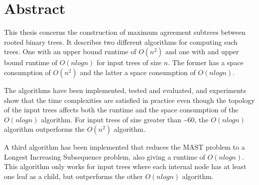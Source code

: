\chapter*{Abstract}
This thesis concerns the construction of maximum agreement subtrees between rooted binary trees. It describes two different algorithms for computing such trees. One with an upper bound runtime of $O(n^2)$ and one with and upper bound runtime of $O(nlogn)$ for input trees of size $n$. The former has a space consumption of $O(n^2)$ and the latter a space consumption of $O(nlogn)$.

The algorithms have been implemented, tested and evaluated, and experiments show that the time complexities are satisfied in practice even though the topology of the input trees affects both the runtime and the space consumption of the $O(nlogn)$ algorithm. For input trees of size greater than \textasciitilde 60, the $O(nlogn)$ algorithm outperforms the $O(n^2)$ algorithm.

A third algorithm has been implemented that reduces the MAST problem to a Longest Increasing Subsequence problem, also giving a runtime of $O(nlogn)$. This algorithm only works for input trees where each internal node has at least one leaf as a child, but outperforms the other $O(nlogn)$ algorithm.
